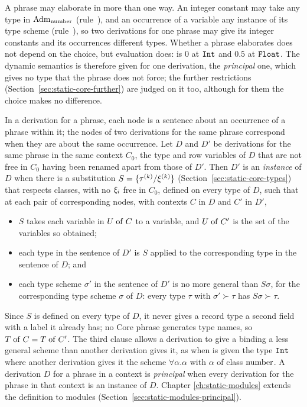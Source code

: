 A phrase may elaborate in more than one way. An integer constant may take any
type in $\mathrm{Adm}_{\mathrm{number}}$ (rule~), and an occurrence of a
variable any instance of its type scheme (rule~),
so two derivations for one phrase may give its integer constants and its
occurrences different types. Whether a phrase elaborates does not depend on the
choice, but evaluation does:  is $0$ at $\mathtt{Int}$
and $0.5$ at $\mathtt{Float}$. The dynamic semantics is therefore given for one
derivation, the \emph{principal} one, which gives no type that the phrase does
not force; the further restrictions (Section~\ref{sec:static-core-further}) are
judged on it too, although for them the choice makes no difference. %

In a derivation for a phrase, each node is a sentence about an occurrence of a
phrase within it; the nodes of two derivations for the same phrase correspond
when they are about the same occurrence. Let $D$ and $D'$ be derivations for
the same phrase in the same context $C_0$, the type and row variables of $D$
that are not free in $C_0$ having been renamed apart from those of $D'$. Then
$D'$ is an \emph{instance} of $D$ when there is a substitution
$S = \{\tau^{(k)}/\xi^{(k)}\}$ (Section~\ref{sec:static-core-types}) that
respects classes, with no $\xi_i$ free in $C_0$, defined on every type of
$D$, such that at each pair of corresponding nodes, with contexts $C$ in $D$ and
$C'$ in $D'$,
\begin{itemize}
\item $S$ takes each variable in $U \mathrel{\mathrm{of}} C$ to a variable, and $U \mathrel{\mathrm{of}} C'$ is the
  set of the variables so obtained;
\item each type in the sentence of $D'$ is $S$ applied to the corresponding
  type in the sentence of $D$; and
\item each type scheme $\sigma'$ in the sentence of $D'$ is no more general
  than $S\sigma$, for the corresponding type scheme $\sigma$ of $D$: every type
  $\tau$ with $\sigma' \succ \tau$ has $S\sigma \succ \tau$.
\end{itemize}
Since $S$ is defined on every type of $D$, it never gives a record type a
second field with a label it already has; no Core phrase generates type names,
so $T \mathrel{\mathrm{of}} C = T \mathrel{\mathrm{of}} C'$. The third clause allows a derivation to give a binding
a less general scheme than another derivation gives it, as when
 is given the type $\mathtt{Int}$ where another
derivation gives it the scheme $\forall\alpha.\alpha$ with $\alpha$ of class
$\mathrm{number}$. A derivation $D$ for a phrase in a context is \emph{principal} when
every derivation for the phrase in that context is an instance of $D$. Chapter
\ref{ch:static-modules} extends the definition to modules
(Section~\ref{sec:static-modules-principal}).

